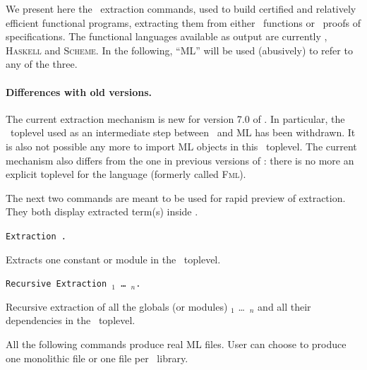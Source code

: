 \label{Extraction}

We present here the \Coq\ extraction commands, used to build certified
and relatively efficient functional programs, extracting them from
either \Coq\ functions or \Coq\ proofs of specifications. The
functional languages available as output are currently \ocaml{},
\textsc{Haskell} and \textsc{Scheme}.  In the following, ``ML'' will
be used (abusively) to refer to any of the three.

\paragraph{Differences with old versions.}
The current extraction mechanism is new for version 7.0 of {\Coq}.
In particular, the \FW\ toplevel used as an intermediate step between 
\Coq\ and ML has been withdrawn.  It is also not possible 
any more to import ML objects in this \FW\ toplevel.
The current mechanism also differs from
the one in previous versions of \Coq: there is no more
an explicit toplevel for the language (formerly called \textsc{Fml}). 


The next two commands are meant to be used for rapid preview of
extraction. They both display extracted term(s) inside \Coq.

\begin{description}
\item {\tt Extraction \qualid.} ~\par
  Extracts one constant or module in the \Coq\ toplevel.

\item {\tt Recursive Extraction  \qualid$_1$ \dots\ \qualid$_n$.} ~\par
  Recursive extraction of all the globals (or modules) \qualid$_1$ \dots\
  \qualid$_n$ and all their dependencies in the \Coq\ toplevel.
\end{description}


All the following commands produce real ML files. User can choose to produce
one monolithic file or one file per \Coq\ library. 

